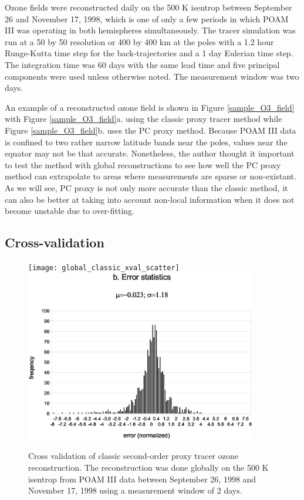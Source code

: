 Ozone fields were reconstructed daily on the 500 K isentrop
between September 26 and November 17, 1998,
which is one of only a few periods in which POAM III was operating in both 
hemispheres simultaneously.
The tracer simulation was run at a 50 by 50 resolution or 400 by 400 km at
the poles with a 1.2 hour Runge-Kutta time step for the back-trajectories
and a 1 day Eulerian time step.
The integration time was 60 days with the same lead time
and five principal components were used unless otherwise noted.
The measurement window was two days.

An example of a reconstructed ozone field is shown in Figure \ref{sample_O3_field}
with Figure \ref{sample_O3_field}a. using the classic proxy tracer method
while Figure \ref{sample_O3_field}b. uses the PC proxy method.
Because POAM III data is confined to two rather narrow latitude bands near
the poles, values near the equator may not be that accurate.
Nonetheless, the author thought it important to test the method with global
reconstructions to see how well the PC proxy method can extrapolate
to areas where measurements are sparse or non-existant.
As we will see, PC proxy is not only more accurate than the classic method,
it can also be better at taking into account non-local information
when it does not become unstable due to over-fitting.

\subsection{Cross-validation}

\label{cross_validation}

\begin{figure}
  \centering
  \texttt{[image: global\_classic\_xval\_scatter]}
  \includegraphics[width=0.9\textwidth]{global_classic_xval_error}
  \caption{Cross validation of classic second-order proxy tracer ozone reconstruction. The reconstruction was done globally on the 500 K isentrop from POAM III data between September 26, 1998 and November 17, 1998 using a measurement window of 2 days.}
  \label{classic_cross_validation}
\end{figure}

